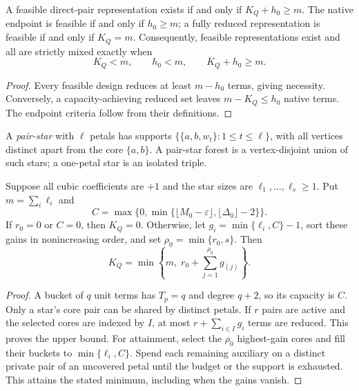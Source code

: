 \begin{theorem}
\label{thm:static-phase-boundary}
A feasible direct-pair representation exists if and only if $K_Q+h_0\geq m$.
The native endpoint is feasible if and only if $h_0\geq m$; a fully reduced
representation is feasible if and only if $K_Q=m$. Consequently, feasible
representations exist and all are strictly mixed exactly when
\begin{equation}
 K_Q<m,\qquad h_0<m,\qquad K_Q+h_0\geq m.
 \label{eq:static-mixed-only}
\end{equation}
\end{theorem}
\begin{proof}
Every feasible design reduces at least $m-h_0$ terms, giving necessity.
Conversely, a capacity-achieving reduced set leaves $m-K_Q\leq h_0$ native
terms. The endpoint criteria follow from their definitions.
\end{proof}

A \emph{pair-star} with $\ell$ petals has supports
$\{\{a,b,w_t\}:1\leq t\leq\ell\}$, with all vertices distinct apart from
the core $\{a,b\}$. A pair-star forest is a vertex-disjoint union of such
stars; a one-petal star is an isolated triple.

\begin{theorem}
\label{thm:pair-star-capacity}
Suppose all cubic coefficients are $+1$ and the star sizes are
$\ell_1,\ldots,\ell_s\geq1$. Put $m=\sum_i\ell_i$ and
\[
 C=\max\{0,\min\{\lfloor M_0-\varepsilon\rfloor,
                         \lfloor\Delta_0\rfloor-2\}\}.
\]
If $r_0=0$ or $C=0$, then $K_Q=0$. Otherwise, let
$g_i=\min\{\ell_i,C\}-1$, sort these gains in nonincreasing order,
and set $\rho_0=\min\{r_0,s\}$. Then
\begin{equation}
 K_Q=\min\left\{m,\;r_0+\sum_{j=1}^{\rho_0}g_{(j)}\right\}.
 \label{eq:pair-star-capacity}
\end{equation}
\end{theorem}
\begin{proof}
A bucket of $q$ unit terms has $T_p=q$ and degree $q+2$, so its capacity is
$C$. Only a star's core pair can be shared by distinct petals. If $r$ pairs
are active and the selected cores are indexed by $I$, at most
$r+\sum_{i\in I}g_i$ terms are reduced. This proves the upper bound.
For attainment, select the $\rho_0$ highest-gain cores and fill their buckets
to $\min\{\ell_i,C\}$. Spend each remaining auxiliary on a distinct private
pair of an uncovered petal until the budget or the support is exhausted.
This attains the stated minimum, including when the gains vanish.
\end{proof}

